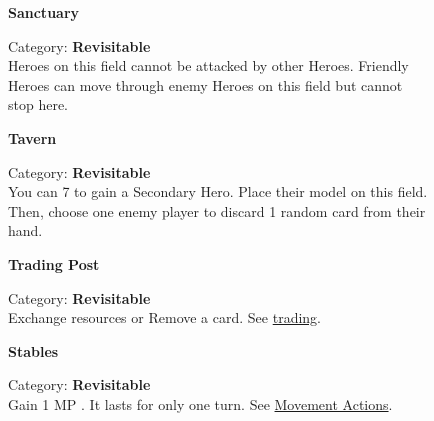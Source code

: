 \begin{figure}[H]
  \begin{minipage}[t]{0.47\textwidth}
    \vspace{0pt}
    \centering
    \textbf{Sanctuary}\medskip
    \caption{\small Category: \textbf{Revisitable}\\
      Heroes on this field cannot be attacked by other Heroes.
      Friendly Heroes can move through enemy Heroes on this field but cannot stop here.}
  \end{minipage}\hfill
  \begin{minipage}[t]{0.47\textwidth}
    \vspace{0pt}
    \centering
    \textbf{Tavern}\medskip
    \caption{\small Category: \textbf{Revisitable}\\
      You can 
      7 
      to gain a Secondary Hero.
      Place their model on this field.
      Then, choose one enemy player to discard 1 random card from their hand.}
  \end{minipage}
\end{figure}

\begin{figure}[H]
  \begin{minipage}[t]{0.47\textwidth}
    \vspace{0pt}
    \centering
    \hypertarget{Trading Post}{\textbf{Trading Post}}\medskip
    \caption{\small Category: \textbf{Revisitable}\\
      Exchange resources or Remove a card.
      See \protect\hyperlink{Trading}{trading}.}
  \end{minipage}\hfill
  \begin{minipage}[t]{0.47\textwidth}
    \vspace{0pt}
    \centering
    \textbf{Stables}\medskip
    \caption{\small Category: \textbf{Revisitable}\\
      Gain 1 MP .
      It lasts for only one turn.
      See \protect\hyperlink{Movement}{Movement Actions}.
    }
  \end{minipage}
\end{figure}

